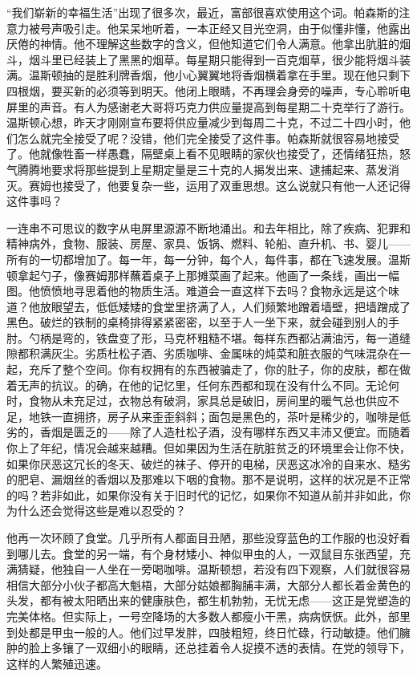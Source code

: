 ``我们崭新的幸福生活''出现了很多次，最近，富部很喜欢使用这个词。帕森斯的注意力被号声吸引走。他呆呆地听着，一本正经又目光空洞，由于似懂非懂，他露出厌倦的神情。他不理解这些数字的含义，但他知道它们令人满意。他拿出肮脏的烟斗，烟斗里已经装上了黑黑的烟草。每星期只能得到一百克烟草，很少能将烟斗装满。温斯顿抽的是胜利牌香烟，他小心翼翼地将香烟横着拿在手里。现在他只剩下四根烟，要买新的必须等到明天。他闭上眼睛，不再理会身旁的噪声，专心聆听电屏里的声音。有人为感谢老大哥将巧克力供应量提高到每星期二十克举行了游行。温斯顿心想，昨天才刚刚宣布要将供应量减少到每周二十克，不过二十四小时，他们怎么就完全接受了呢？没错，他们完全接受了这件事。帕森斯就很容易地接受了。他就像牲畜一样愚蠢，隔壁桌上看不见眼睛的家伙也接受了，还情绪狂热，怒气腾腾地要求将那些提到上星期定量是三十克的人揭发出来、逮捕起来、蒸发消灭。赛姆也接受了，他要复杂一些，运用了双重思想。这么说就只有他一人还记得这件事吗？

一连串不可思议的数字从电屏里源源不断地涌出。和去年相比，除了疾病、犯罪和精神病外，食物、服装、房屋、家具、饭锅、燃料、轮船、直升机、书、婴儿——所有的一切都增加了。每一年，每一分钟，每个人，每件事，都在飞速发展。温斯顿拿起勺子，像赛姆那样蘸着桌子上那摊菜画了起来。他画了一条线，画出一幅图。他愤愤地寻思着他的物质生活。难道会一直这样下去吗？食物永远是这个味道？他放眼望去，低低矮矮的食堂里挤满了人，人们频繁地蹭着墙壁，把墙蹭成了黑色。破烂的铁制的桌椅排得紧紧密密，以至于人一坐下来，就会碰到别人的手肘。勺柄是弯的，铁盘变了形，马克杯粗糙不堪。每样东西都沾满油污，每一道缝隙都积满灰尘。劣质杜松子酒、劣质咖啡、金属味的炖菜和脏衣服的气味混杂在一起，充斥了整个空间。你有权拥有的东西被骗走了，你的肚子，你的皮肤，都在做着无声的抗议。的确，在他的记忆里，任何东西都和现在没有什么不同。无论何时，食物从未充足过，衣物总有破洞，家具总是破旧，房间里的暖气总也供应不足，地铁一直拥挤，房子从来歪歪斜斜；面包是黑色的，茶叶是稀少的，咖啡是低劣的，香烟是匮乏的——除了人造杜松子酒，没有哪样东西又丰沛又便宜。而随着你上了年纪，情况会越来越糟。但如果因为生活在肮脏贫乏的环境里会让你不快，如果你厌恶这冗长的冬天、破烂的袜子、停开的电梯，厌恶这冰冷的自来水、糙劣的肥皂、漏烟丝的香烟以及那难以下咽的食物。那不是说明，这样的状况是不正常的吗？若非如此，如果你没有关于旧时代的记忆，如果你不知道从前并非如此，你为什么还会觉得这些是难以忍受的？

他再一次环顾了食堂。几乎所有人都面目丑陋，那些没穿蓝色的工作服的也没好看到哪儿去。食堂的另一端，有个身材矮小、神似甲虫的人，一双鼠目东张西望，充满猜疑，他独自一人坐在一旁喝咖啡。温斯顿想，若没有四下观察，人们就很容易相信大部分小伙子都高大魁梧，大部分姑娘都胸脯丰满，大部分人都长着金黄色的头发，都有被太阳晒出来的健康肤色，都生机勃勃，无忧无虑——这正是党塑造的完美体格。但实际上，一号空降场的大多数人都瘦小干黑，病病恹恹。此外，部里到处都是甲虫一般的人。他们过早发胖，四肢粗短，终日忙碌，行动敏捷。他们臃肿的脸上多镶了一双细小的眼睛，还总挂着令人捉摸不透的表情。在党的领导下，这样的人繁殖迅速。

